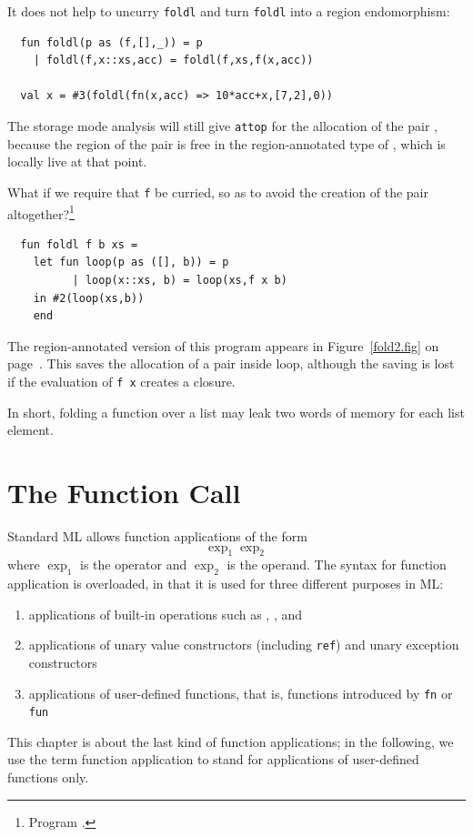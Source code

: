 \documentclass[12pt]{book}
\begin{document}
It does not help to uncurry {\tt foldl} and turn {\tt foldl} into a
region endomorphism:
\begin{verbatim}
  fun foldl(p as (f,[],_)) = p
    | foldl(f,x::xs,acc) = foldl(f,xs,f(x,acc))

  val x = #3(foldl(fn(x,acc) => 10*acc+x,[7,2],0))
\end{verbatim}
The storage mode analysis will still give {\tt attop} for the
allocation of the pair , because the region of the pair
is free in the region-annotated type of , which is locally
live at that point.

What if we require that {\tt f} be curried, so as to avoid the
creation of the pair altogether?\footnote{Program
  .}
\begin{verbatim}
  fun foldl f b xs =
    let fun loop(p as ([], b)) = p
          | loop(x::xs, b) = loop(xs,f x b)
    in #2(loop(xs,b))
    end
\end{verbatim}
The region-annotated version of this program appears in
Figure~\ref{fold2.fig} on page~\pageref{fold2.fig}. This saves the
allocation of a pair inside loop, although the saving is lost if the
evaluation of {\tt f x} creates a closure.

In short, folding a function over a list may leak two words of memory
for each list element.

\chapter{The Function Call}
Standard ML allows function applications of the form
$$\exp_1 \exp_2$$
where $\exp_1$ is the operator and $\exp_2$ is the
operand.  The syntax for function application is overloaded, in that
it is used for three different purposes in ML:
\begin{enumerate}
\item applications of built-in operations such as \boxml{+},
  \boxml{=}, and \boxml{:=}
\item applications of unary value constructors (including {\tt ref})
  and unary exception constructors
\item applications of user-defined functions, that is, functions
  introduced by {\tt fn} or {\tt fun}
\end{enumerate}
This chapter is about the last kind of function applications; in the
following, we use the term function application to stand for
applications of user-defined functions only.
\end{document}
